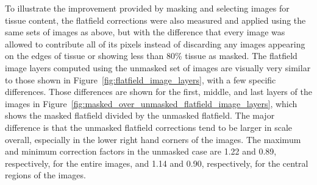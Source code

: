 \documentclass[letterpaper,11pt]{article}
\newcommand{\reffig}[1]{Figure~\ref{#1}}
\begin{document}
To illustrate the improvement provided by masking and selecting images for tissue content, the flatfield corrections were also measured and applied using the same sets of images as above, but with the difference that every image was allowed to contribute all of its pixels instead of discarding any images appearing on the edges of tissue or showing less than 80\% tissue as masked. The flatfield image layers computed using the unmasked set of images are visually very similar to those shown in \reffig{fig:flatfield_image_layers}, with a few specific differences. Those differences are shown for the first, middle, and last layers of the images in \reffig{fig:masked_over_unmasked_flatfield_image_layers}, which shows the masked flatfield divided by the unmasked flatfield. The major difference is that the unmasked flatfield corrections tend to be larger in scale overall, especially in the lower right hand corners of the images. The maximum and minimum correction factors in the unmasked case are 1.22 and 0.89, respectively, for the entire images, and 1.14 and 0.90, respectively, for the central regions of the images.
\end{document}
